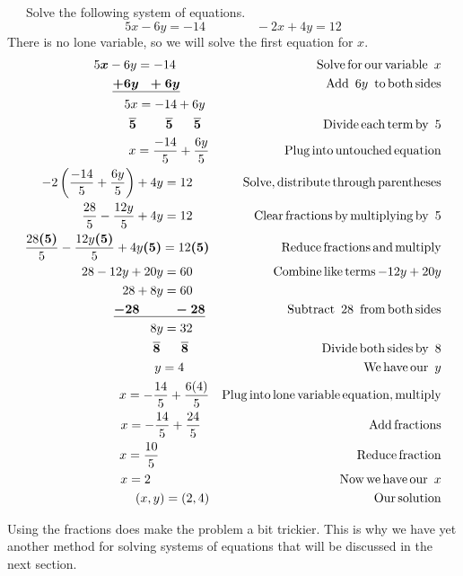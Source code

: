 \begin{example}~~~Solve the following system of equations.
  $$5 x - 6 y = - 14\qquad\qquad - 2 x + 4 y = 12$$
  There is no lone variable, so we will solve the first equation for $x$.
	\begin{eqnarray*}
      5 \boldsymbol{x} - 6 y = - 14~~~~~~~~ &  & \operatorname{Solve} \operatorname{for} \operatorname{our} \operatorname{variable~} x\\
    \boldsymbol{\underline{+ 6 y ~~+ 6 y}}~~~~~~~ &  & \operatorname{Add~} 6 y \operatorname{~to} \operatorname{both} \operatorname{sides}\\
      5 x = - 14 + 6 y~ &  &\\
    \boldsymbol{\overline{5} ~~~~~~~ \overline{5} ~~~~~ \overline{5}}~~ &  &  \operatorname{Divide} \operatorname{each} \operatorname{term} \operatorname{by~} 5\\
    x = \frac{- 14}{5} + \frac{6 y}{5} &  & \operatorname{Plug} \operatorname{into}
    \operatorname{untouched} \operatorname{equation}\\
    - 2 \left( \frac{- 14}{5} + \frac{6 y}{5} \right) + 4 y = 12~~~~ &  &
    \operatorname{Solve}, \operatorname{distribute} \operatorname{through} \operatorname{parentheses}\\
    \frac{28}{5} - \frac{12 y}{5} + 4 y = 12~~~~ &  & \operatorname{Clear}
    \operatorname{fractions} \operatorname{by} \operatorname{multiplying} \operatorname{by~} 5\\
    \frac{28 \boldsymbol{(5)}}{5} - \frac{12 y \boldsymbol{(5)}}{5} + 4 y
    \boldsymbol{(5)} = 12 \boldsymbol{(5)} &  & \operatorname{Reduce} \operatorname{fractions}
    \operatorname{and} \operatorname{multiply}\\
    28 - 12 y + 20 y = 60~~~~ &  & \operatorname{Combine} \operatorname{like} \operatorname{terms} - 12 y
    + 20 y\\
    28 + 8 y = 60~~~~ &  &\\
    \underline{\boldsymbol{- 28 ~~~~~~~~- 28}}~ &  &  \operatorname{Subtract~} 28 \operatorname{~from} \operatorname{both}
    \operatorname{sides}\\
    8 y = 32~~~~ &  & \\
    \boldsymbol{\overline{8} ~~~~~ \overline{8}}~~~~~ &  & \operatorname{Divide} \operatorname{both} \operatorname{sides} \operatorname{by~} 8\\
    y = 4~~~~~~ &  & \operatorname{We} \operatorname{have} \operatorname{our~} y\\
    x = -\frac{14}{5} + \frac{6 (4)}{5} &  & \operatorname{Plug} \operatorname{into}
    \operatorname{lone} \operatorname{variable} \operatorname{equation}, \operatorname{multiply}\\
    x = -\frac{14}{5} + \frac{24}{5}~~ &  & \operatorname{Add} \operatorname{fractions}\\
    x = \frac{10}{5}~~~~~~~~~~~~ &  & \operatorname{Reduce} \operatorname{fraction}\\
    x = 2~~~~~~~~~~~~~~ &  & \operatorname{Now} \operatorname{we} \operatorname{have} \operatorname{our~} x\\
    (x,y)=(2, 4) &  & \operatorname{Our} \operatorname{solution}
  \end{eqnarray*}
\end{example}

Using the fractions does make the problem a bit trickier. This is why we
have yet another method for solving systems of equations that will be discussed in
the next section.

%
